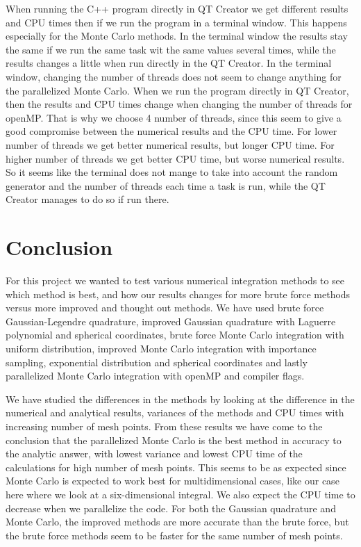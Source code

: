 \documentclass[12pt,a4paper,english]{article}
\begin{document}
When running the C++ program directly in QT Creator we get different results and CPU times then if we run the program in a terminal window. This happens especially for the Monte Carlo methods. In the terminal window the results stay the same if we run the same task wit the same values several times, while the results changes a little when run directly in the QT Creator. In the terminal window, changing the number of threads does not seem to change anything for the parallelized Monte Carlo. When we run the program directly in QT Creator, then the results and CPU times change when changing the number of threads for openMP. That is why we choose 4 number of threads, since this seem to give a good compromise between the numerical results and the CPU time. For lower number of threads we get better numerical results, but longer CPU time. For higher number of threads we get better CPU time, but worse numerical results. So it seems like the terminal does not mange to take into account the random generator and the number of threads each time a task is run, while the QT Creator manages to do so if run there.

\section{Conclusion}
For this project we wanted to test various numerical integration methods to see which method is best, and how our results changes for more brute force methods versus more improved and thought out methods. We have used brute force Gaussian-Legendre quadrature, improved Gaussian quadrature with Laguerre polynomial and spherical coordinates, brute force Monte Carlo integration with uniform distribution, improved Monte Carlo integration with importance sampling, exponential distribution and spherical coordinates and lastly parallelized Monte Carlo integration with openMP and compiler flags.

We have studied the differences in the methods by looking at the difference in the numerical and analytical results, variances of the methods and CPU times with increasing number of mesh points. From these results we have come to the conclusion that the parallelized Monte Carlo is the best method in accuracy to the analytic answer, with lowest variance and lowest CPU time of the calculations for high number of mesh points. This seems to be as expected since Monte Carlo is expected to work best for multidimensional cases, like our case here where we look at a six-dimensional integral. We also expect the CPU time to decrease when we parallelize the code. For both the Gaussian quadrature and Monte Carlo, the improved methods are more accurate than the brute force, but the brute force methods seem to be faster for the same number of mesh points. 
\end{document}
